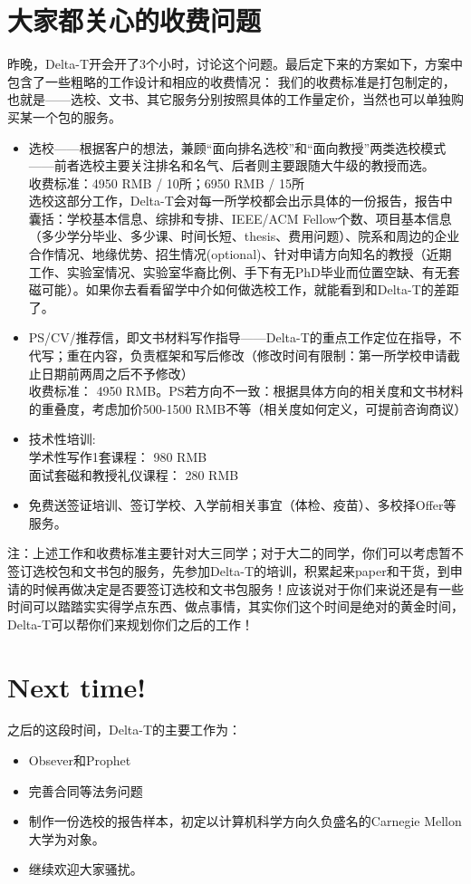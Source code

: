 \documentclass{article}
\begin{document}
\section{大家都关心的收费问题}
昨晚，Delta-T开会开了3个小时，讨论这个问题。最后定下来的方案如下，方案中包含了一些粗略的工作设计和相应的收费情况：
我们的收费标准是打包制定的，也就是——选校、文书、其它服务分别按照具体的工作量定价，当然也可以单独购买某一个包的服务。
\begin{itemize}


\item{选校——根据客户的想法，兼顾“面向排名选校”和“面向教授”两类选校模式——前者选校主要关注排名和名气、后者则主要跟随大牛级的教授而选。\\收费标准：4950 RMB / 10所；6950 RMB / 15所 \\
	  选校这部分工作，Delta-T会对每一所学校都会出示具体的一份报告，报告中囊括：学校基本信息、综排和专排、IEEE/ACM Fellow个数、项目基本信息（多少学分毕业、多少课、时间长短、thesis、费用问题）、院系和周边的企业合作情况、地缘优势、招生情况(optional)、针对申请方向知名的教授（近期工作、实验室情况、实验室华裔比例、手下有无PhD毕业而位置空缺、有无套磁可能）。如果你去看看留学中介如何做选校工作，就能看到和Delta-T的差距了。}
\item{PS/CV/推荐信，即文书材料写作指导——Delta-T的重点工作定位在指导，不代写；重在内容，负责框架和写后修改（修改时间有限制：第一所学校申请截止日期前两周之后不予修改） \\ 收费标准： 4950 RMB。PS若方向不一致：根据具体方向的相关度和文书材料的重叠度，考虑加价500-1500 RMB不等（相关度如何定义，可提前咨询商议）}
\item{技术性培训: \\ 学术性写作1套课程：{\indent	\indent} 980 RMB		\\		面试套磁和教授礼仪课程：{\indent \indent} 280 RMB}
\item{免费送签证培训、签订学校、入学前相关事宜（体检、疫苗）、多校择Offer等服务。}
\end{itemize}
\textcolor{colorname2}{注：上述工作和收费标准主要针对大三同学；对于大二的同学，你们可以考虑暂不签订选校包和文书包的服务，先参加Delta-T的培训，积累起来paper和干货，到申请的时候再做决定是否要签订选校和文书包服务！应该说对于你们来说还是有一些时间可以踏踏实实得学点东西、做点事情，其实你们这个时间是绝对的黄金时间，Delta-T可以帮你们来规划你们之后的工作！}

\section{Next time!}
之后的这段时间，Delta-T的主要工作为：\begin{itemize}
\item{Obsever和Prophet}
\item{完善合同等法务问题}
\item{制作一份选校的报告样本，初定以计算机科学方向久负盛名的Carnegie Mellon大学为对象。}
\item{继续欢迎大家骚扰。}
\end{itemize}
\end{document}
